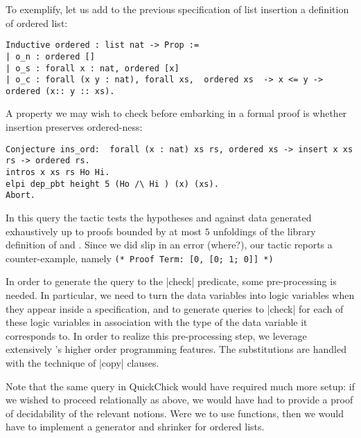 To exemplify, let us add to the previous specification of list
insertion a definition of ordered list:
\begin{lstlisting}
Inductive ordered : list nat -> Prop :=
| o_n : ordered []
| o_s : forall x : nat, ordered [x]
| o_c : forall (x y : nat), forall xs,  ordered xs  -> x <= y -> ordered (x:: y :: xs).     
\end{lstlisting}
%
A property we may wish to check before embarking in a formal proof is
whether insertion preserves ordered-ness:
\begin{lstlisting}
Conjecture ins_ord:  forall (x : nat) xs rs, ordered xs -> insert x xs rs -> ordered rs.
intros x xs rs Ho Hi.
elpi dep_pbt height 5 (Ho /\ Hi ) (x) (xs).
Abort.
\end{lstlisting}
In this query the tactic tests the hypotheses  and 
against data  generated exhaustively up to proofs bounded
by at most $5$ unfoldings of the library  definition
of  and . Since we did slip in an error (where?), our
tactic reports a counter-example, namely
\verb|(* Proof Term: [0, [0; 1; 0]] *)|


In order to generate the query to the \lsti|check| predicate, some
pre-processing is needed. In particular, we need to turn the data
variables into \lP logic variables when they appear inside a
specification, and to generate queries to \lsti|check| for each of
these logic variables in association with the type of the data
variable it corresponds to.  In order to realize this pre-processing step,
we leverage extensively \lP's higher order programming features. The
substitutions are handled with the technique of \lsti|copy| clauses.


Note that the same query in \textsf{QuickChick} would have required
much more setup: if we wished to proceed relationally as above, we
would have had to provide a proof of decidability of the relevant
notions. Were we to use functions, then we would have to implement a
generator and shrinker for ordered lists.




